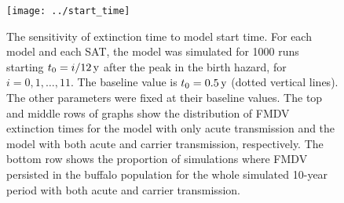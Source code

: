 \documentclass[12pt, UKenglish]{article}  %
\begin{document}
\begin{figure}
  \centering
  \texttt{[image: ../start\_time]}
  \caption{The sensitivity of extinction time to model start time.
    For each model and each SAT, the model was simulated for
    1000 runs starting $t_0 = \unit[i / 12]{y}$ after the peak in the
    birth hazard, for $i = 0, 1, \dots, 11$. The baseline value is
    $t_0 = \unit[0.5]{y}$ (dotted vertical lines). The other
    parameters were fixed at their baseline values. The top and middle
    rows of graphs show the distribution of FMDV extinction times for
    the model with only acute transmission and the model with both
    acute and carrier transmission, respectively. The bottom row shows
    the proportion of simulations where FMDV persisted in the buffalo
    population for the whole simulated 10-year period with both acute
    and carrier transmission.}
  \label{fig:start_time}
\end{figure}
\end{document}
